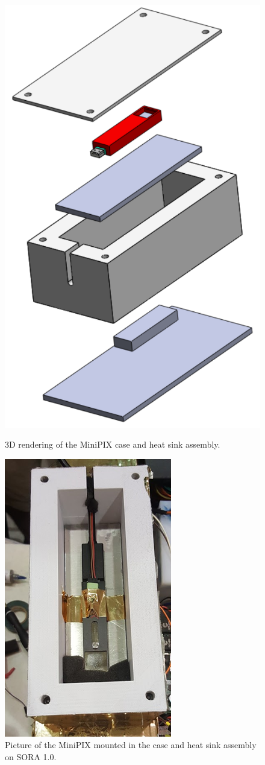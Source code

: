 \begin{figure}[]
  \begin{minipage}[c]{0.49\linewidth}
    \includegraphics[scale=1, width=.5\textwidth]{Figures/Minipix_case_assembly.pdf}
    \caption{3D rendering of the MiniPIX case and heat sink assembly. } %
    \label{fig:case_assem}
  \end{minipage}
  \hfill
  \begin{minipage}[c]{0.49\linewidth}
    \centering
    \includegraphics[scale=1, width=.5\textwidth]{Figures/minipix_mounted.png}
    \caption{Picture of the MiniPIX mounted in the case and heat sink assembly on SORA 1.0.} %
    \label{fig:case_assem_pic}
  \end{minipage}
\end{figure}

